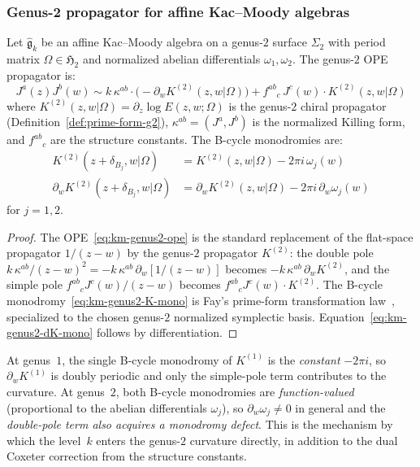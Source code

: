 \subsubsection{Genus-2 propagator for affine Kac--Moody algebras}

\begin{proposition}
\label{prop:km-genus2-propagator}
Let $\widehat{\mathfrak{g}}_k$ be an affine Kac--Moody algebra on a
genus-$2$ surface $\Sigma_2$ with period matrix
$\Omega \in \mathfrak{H}_2$ and normalized abelian differentials
$\omega_1, \omega_2$. The genus-$2$ OPE propagator is:
\begin{equation}\label{eq:km-genus2-ope}
J^a(z) J^b(w) \sim
 k\,\kappa^{ab} \cdot \bigl(-\partial_w K^{(2)}(z,w|\Omega)\bigr)
 + f^{ab}{}_{c}\, J^c(w) \cdot K^{(2)}(z,w|\Omega)
\end{equation}
where $K^{(2)}(z,w|\Omega) = \partial_z \log E(z,w;\Omega)$
is the genus-$2$ chiral propagator
\textup{(}Definition~\textup{\ref{def:prime-form-g2})},
$\kappa^{ab} = (J^a, J^b)$ is the normalized Killing form,
and $f^{ab}{}_c$ are the structure constants.
The B-cycle monodromies are:
\begin{align}
K^{(2)}(z + \delta_{B_j}, w|\Omega)
 &= K^{(2)}(z, w|\Omega) - 2\pi i\, \omega_j(w)
 \label{eq:km-genus2-K-mono} \\
\partial_w K^{(2)}(z + \delta_{B_j}, w|\Omega)
 &= \partial_w K^{(2)}(z, w|\Omega) - 2\pi i\, \partial_w\omega_j(w)
 \label{eq:km-genus2-dK-mono}
\end{align}
for $j = 1, 2$.
\end{proposition}

\begin{proof}
The OPE~\eqref{eq:km-genus2-ope} is the standard replacement of the
flat-space propagator $1/(z-w)$ by the genus-$2$ propagator $K^{(2)}$:
the double pole $k\,\kappa^{ab}/(z-w)^2 = -k\,\kappa^{ab}\,\partial_w[1/(z-w)]$
becomes $-k\,\kappa^{ab}\,\partial_w K^{(2)}$, and the simple pole
$f^{ab}{}_c J^c(w)/(z-w)$ becomes $f^{ab}{}_c J^c(w) \cdot K^{(2)}$.
	The B-cycle monodromy~\eqref{eq:km-genus2-K-mono} is Fay's
	prime-form transformation law~\cite{Fay73}, specialized to the
	chosen genus-$2$ normalized symplectic basis.
Equation~\eqref{eq:km-genus2-dK-mono} follows by differentiation.
\end{proof}

\begin{remark}\label{rem:g1-g2-mono-contrast}
At genus~$1$, the single B-cycle monodromy of $K^{(1)}$ is the
\emph{constant} $-2\pi i$, so $\partial_w K^{(1)}$ is doubly periodic
and only the simple-pole term contributes to the curvature. At
genus~$2$, both B-cycle monodromies are \emph{function-valued}
(proportional to the abelian differentials $\omega_j$), so
$\partial_w\omega_j \neq 0$ in general and the \emph{double-pole term
also acquires a monodromy defect}. This is the mechanism by which the
level~$k$ enters the genus-$2$ curvature directly, in addition to the
dual Coxeter correction from the structure constants.
\end{remark}

